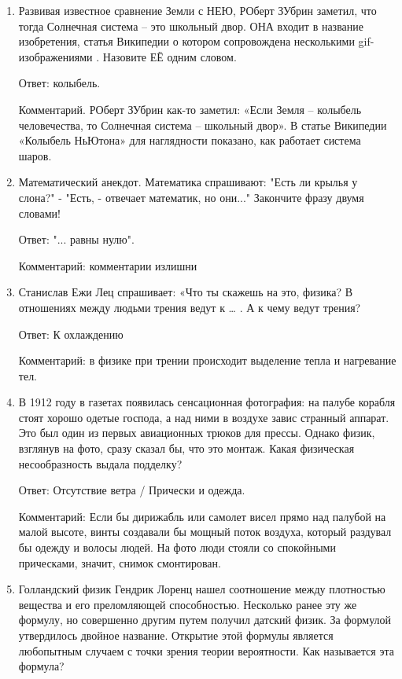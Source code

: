 \documentclass[oneside,final,14pt]{extreport}
\begin{document}
\begin{enumerate}
    \item Развивая известное сравнение Земли с НЕЮ, РОберт ЗУбрин заметил, что тогда Солнечная система – это школьный двор. ОНА входит в название изобретения, статья Википедии о котором сопровождена несколькими gif-изображениями . Назовите ЕЁ одним словом.

    Ответ: колыбель.

    Комментарий. РОберт ЗУбрин как-то заметил: «Если Земля – колыбель человечества, то Солнечная система – школьный двор». В статье Википедии «Колыбель НьЮтона» для наглядности показано, как работает система шаров.


    \item Математический анекдот. Математика спрашивают: "Есть ли крылья у слона?" - "Есть, - отвечает математик, но они..." Закончите фразу двумя словами!

    Ответ: "... равны нулю".

    Комментарий: комментарии излишни

    \item Станислав Ежи Лец спрашивает: «Что ты скажешь на это, физика? В отношениях между людьми трения ведут к … . А к чему ведут трения?

    Ответ: К охлаждению

    Комментарий: в физике при трении происходит выделение тепла и нагревание тел.

    \item В 1912 году в газетах появилась сенсационная фотография: на палубе корабля стоят хорошо одетые господа, а над ними в воздухе завис странный аппарат. Это был один из первых авиационных трюков для прессы. Однако физик, взглянув на фото, сразу сказал бы, что это монтаж. Какая физическая несообразность выдала подделку?

    Ответ: Отсутствие ветра / Прически и одежда.

    Комментарий: Если бы дирижабль или самолет висел прямо над палубой на малой высоте, винты создавали бы мощный поток воздуха, который раздувал бы одежду и волосы людей. На фото люди стояли со спокойными прическами, значит, снимок смонтирован.

    \item Голландский физик Гендрик Лоренц нашел соотношение между плотностью вещества и его преломляющей способностью. Несколько ранее эту же формулу, но совершенно другим путем получил датский физик. За формулой утвердилось двойное название. Открытие этой формулы является любопытным случаем с точки зрения теории вероятности. Как называется эта формула?


\end{enumerate}
\end{document}
